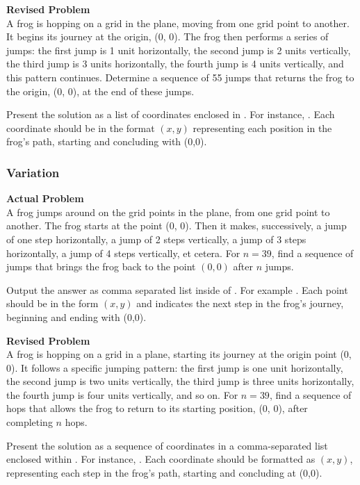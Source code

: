 \textbf{Revised Problem}\\
A frog is hopping on a grid in the plane, moving from one grid point to another. It begins its journey at the origin, (0, 0). The frog then performs a series of jumps: the first jump is 1 unit horizontally, the second jump is 2 units vertically, the third jump is 3 units horizontally, the fourth jump is 4 units vertically, and this pattern continues. Determine a sequence of 55 jumps that returns the frog to the origin, (0, 0), at the end of these jumps.

Present the solution as a list of coordinates enclosed in . For instance, . Each coordinate should be in the format $(x, y)$ representing each position in the frog's path, starting and concluding with (0,0).

\subsubsection{Variation}
\textbf{Actual Problem}\\
A frog jumps around on the grid points in the plane, from one grid point to another. The frog starts at the point (0, 0). Then it makes, successively, a jump of one step horizontally, a jump of 2 steps vertically, a jump of 3 steps horizontally, a jump of 4 steps vertically, et cetera. For $n = 39$, find a sequence of jumps that brings the frog back to the point $(0, 0)$ after $n$ jumps.

Output the answer as comma separated list inside of . For example . Each point should be in the form $(x, y)$ and indicates the next step in the frog's journey, beginning and ending with (0,0).

\textbf{Revised Problem}\\
A frog is hopping on a grid in a plane, starting its journey at the origin point (0, 0). It follows a specific jumping pattern: the first jump is one unit horizontally, the second jump is two units vertically, the third jump is three units horizontally, the fourth jump is four units vertically, and so on. For $n = 39$, find a sequence of hops that allows the frog to return to its starting position, (0, 0), after completing $n$ hops.

Present the solution as a sequence of coordinates in a comma-separated list enclosed within . For instance, . Each coordinate should be formatted as $(x, y)$, representing each step in the frog's path, starting and concluding at (0,0).

